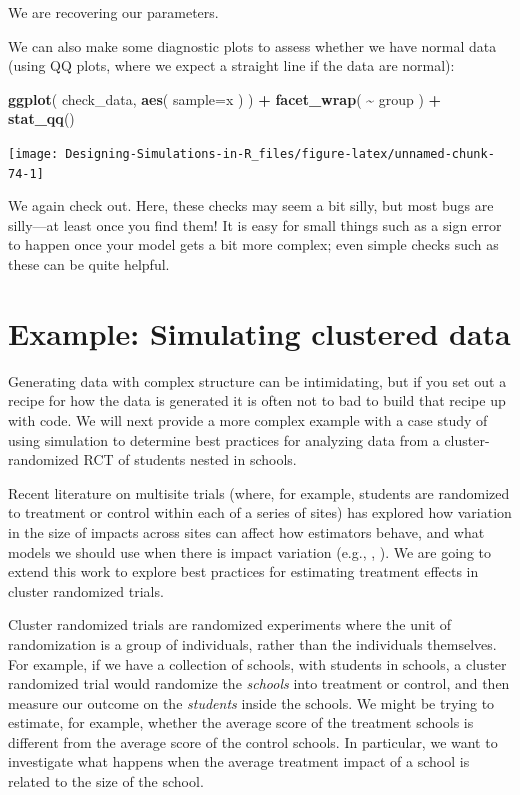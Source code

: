 \documentclass[
]{book}
\newenvironment{Shaded}{\begin{snugshade}}{\end{snugshade}}
\newcommand{\AttributeTok}[1]{\textcolor[rgb]{0.13,0.29,0.53}{#1}}
\newcommand{\FunctionTok}[1]{\textcolor[rgb]{0.13,0.29,0.53}{\textbf{#1}}}
\newcommand{\NormalTok}[1]{#1}
\newcommand{\SpecialCharTok}[1]{\textcolor[rgb]{0.81,0.36,0.00}{\textbf{#1}}}
\begin{document}
We are recovering our parameters.

We can also make some diagnostic plots to assess whether we have normal data (using QQ plots, where we expect a straight line if the data are normal):

\begin{Shaded}
\begin{Highlighting}[]
\FunctionTok{ggplot}\NormalTok{( check\_data, }\FunctionTok{aes}\NormalTok{( }\AttributeTok{sample=}\NormalTok{x ) ) }\SpecialCharTok{+}
  \FunctionTok{facet\_wrap}\NormalTok{( }\SpecialCharTok{\textasciitilde{}}\NormalTok{ group ) }\SpecialCharTok{+}
  \FunctionTok{stat\_qq}\NormalTok{()}
\end{Highlighting}
\end{Shaded}

\begin{center}\texttt{[image: Designing-Simulations-in-R\_files/figure-latex/unnamed-chunk-74-1]} \end{center}

We again check out.
Here, these checks may seem a bit silly, but most bugs are silly---at least once you find them!
It is easy for small things such as a sign error to happen once your model gets a bit more complex; even simple checks such as these can be quite helpful.

\section{Example: Simulating clustered data}\label{case-cluster}

Generating data with complex structure can be intimidating, but if you set out a recipe for how the data is generated it is often not to bad to build that recipe up with code.
We will next provide a more complex example with a case study of using simulation to determine best practices for analyzing data from a cluster-randomized RCT of students nested in schools.

Recent literature on multisite trials (where, for example, students are randomized to treatment or control within each of a series of sites) has explored how variation in the size of impacts across sites can affect how estimators behave, and what models we should use when there is impact variation (e.g., \citet{miratrix2021applied}, \citet{Bloom:2016um}).
We are going to extend this work to explore best practices for estimating treatment effects in cluster randomized trials.

Cluster randomized trials are randomized experiments where the unit of randomization is a group of individuals, rather than the individuals themselves.
For example, if we have a collection of schools, with students in schools, a cluster randomized trial would randomize the \emph{schools} into treatment or control, and then measure our outcome on the \emph{students} inside the schools.
We might be trying to estimate, for example, whether the average score of the treatment schools is different from the average score of the control schools.
In particular, we want to investigate what happens when the average treatment impact of a school is related to the size of the school.
\end{document}
